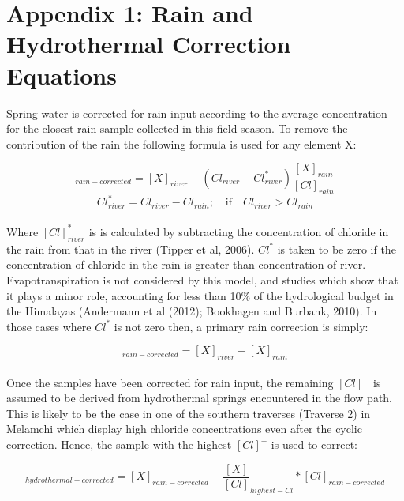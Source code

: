 

\section*{Appendix 1: Rain and Hydrothermal Correction Equations}
\label{app:rain_hydrothermal}


Spring water is corrected for rain input according to the average concentration for the closest rain sample collected in this field season. To remove the contribution of the rain the following formula is used for any element X:

\begin{equation}
    [X]_{rain-corrected}  = [X]_{river} - (Cl_{river} - Cl^*_{river})\frac{[X]_{rain}}{[Cl]_{rain}}
\end{equation}
\begin{equation}
    Cl^*_{river} = Cl_{river} - Cl_{rain}; \quad \text{if} \quad Cl_{river} > Cl_{rain}
\end{equation}\\
    

Where $[Cl]^*_{river}$ is is calculated by subtracting the concentration of chloride in the rain from that in the river (Tipper et al, 2006). $Cl^{*}$ is taken to be zero if the concentration of chloride in the rain is greater than concentration of river. Evapotranspiration is not considered by this model, and studies which show that it plays a minor role, accounting for less than 10\% of the hydrological budget in the Himalayas (Andermann et al (2012); Bookhagen and Burbank, 2010). In those cases where $Cl^*$ is not zero then, a primary rain correction is simply:

\begin{equation}
[X]_{rain-corrected}  = [X]_{river} - [X]_{rain}
\end{equation}\\

Once the samples have been corrected for rain input, the remaining $[Cl]^{-}$ is assumed to be derived from hydrothermal springs encountered in the flow path. This is likely to be the case in one of the southern traverses (Traverse 2) in Melamchi which display high chloride concentrations even after the cyclic correction. Hence, the sample with the highest $[Cl]^{-}$ is used to correct:

\begin{equation}
[X]_{hydrothermal-corrected}  = [X]_{rain-corrected} - \frac{[X]}{[Cl]}_{highest-Cl} * [Cl]_{rain-corrected}
\end{equation}

